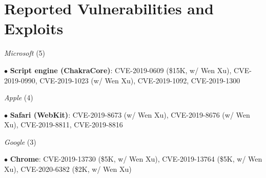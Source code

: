\section*{Reported Vulnerabilities and Exploits}
\begin{description}

\item {\emph{Microsoft} (5)}
	\item $\bullet$ \textbf{Script engine (ChakraCore)}: CVE-2019-0609 (\$15K, w/ Wen Xu), CVE-2019-0990, CVE-2019-1023 (w/ Wen Xu), CVE-2019-1092, CVE-2019-1300

\item {\emph{Apple} (4)}
\item $\bullet$ \textbf{Safari (WebKit)}: CVE-2019-8673 (w/ Wen Xu), CVE-2019-8676 (w/ Wen Xu), CVE-2019-8811, CVE-2019-8816

\item {\emph{Google} (3)}
\item $\bullet$ \textbf{Chrome}: CVE-2019-13730 (\$5K, w/ Wen Xu), CVE-2019-13764 (\$5K, w/ Wen Xu), CVE-2020-6382 (\$2K, w/ Wen Xu)

\end{description}
